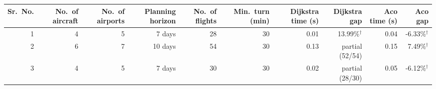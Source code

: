 \begin{tabular}{rrrrrrrrrr}
\toprule
Sr.\ No. & No.\ of aircraft & No.\ of airports & Planning horizon & No.\ of flights & Min.\ turn (min) & Dijkstra time (s) & Dijkstra gap & Aco time (s) & Aco gap \\
\midrule
1 & 4 & 5 & 7 days & 28 & 30 & 0.01 & 13.99\%$^{\dagger}$ & 0.04 & -6.33\%$^{\dagger}$ \\
2 & 6 & 7 & 10 days & 54 & 30 & 0.13 & partial (52/54) & 0.15 & 7.49\%$^{\dagger}$ \\
3 & 4 & 5 & 7 days & 30 & 30 & 0.02 & partial (28/30) & 0.05 & -6.12\%$^{\dagger}$ \\
\bottomrule
\end{tabular}

